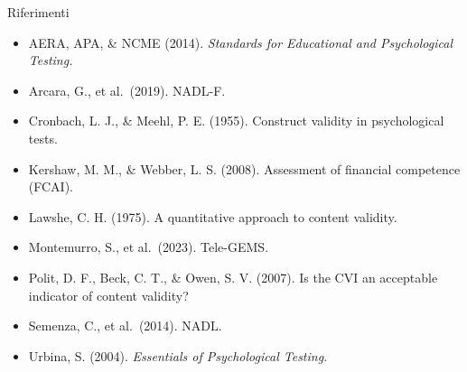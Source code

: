\documentclass[
  ignorenonframetext,
  aspectratio=169,
]{beamer}
\providecommand{\tightlist}{%
  \setlength{\itemsep}{0pt}\setlength{\parskip}{0pt}}
\begin{document}
\begin{frame}{Riferimenti}
\label{riferimenti-1}
\footnotesize

\begin{itemize}
\tightlist
\item
  AERA, APA, \& NCME (2014). \emph{Standards for Educational and
  Psychological Testing.}
\item
  Arcara, G., et al.~(2019). NADL-F.
\item
  Cronbach, L. J., \& Meehl, P. E. (1955). Construct validity in
  psychological tests.
\item
  Kershaw, M. M., \& Webber, L. S. (2008). Assessment of financial
  competence (FCAI).
\item
  Lawshe, C. H. (1975). A quantitative approach to content validity.
\item
  Montemurro, S., et al.~(2023). Tele-GEMS.
\item
  Polit, D. F., Beck, C. T., \& Owen, S. V. (2007). Is the CVI an
  acceptable indicator of content validity?
\item
  Semenza, C., et al.~(2014). NADL.
\item
  Urbina, S. (2004). \emph{Essentials of Psychological Testing.}
\end{itemize}
\end{frame}
\end{document}
